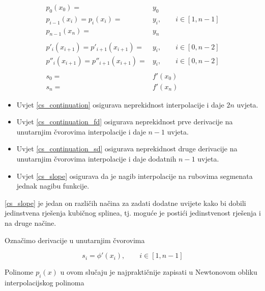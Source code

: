 \begin{conditionbox}
    \begin{align}
        p_0(x_0) =& y_0\nonumber\\
        \label{cs_continuation}
        p_{i-1}(x_i) = p_i(x_i) =& y_i,\qquad i\in[1,n-1]\\
        p_{n-1}(x_n) =& y_n\nonumber\\\nonumber\\
        \label{cs_continuation_fd}
        p'_{i}(x_{i+1}) = p'_{i+1}(x_{i+1}) =& y_i,\qquad i\in[0,n-2]\\
        \label{cs_continuation_sd}
        p''_{i}(x_{i+1}) = p''_{i+1}(x_{i+1}) =& y_i,\qquad i\in[0,n-2]\\\nonumber\\
        s_0=&f'(x_0)\nonumber\\
        \label{cs_slope}
        s_n=&f'(x_n)
    \end{align}

    \begin{itemize}
        \item Uvjet \ref{cs_continuation} osigurava neprekidnost interpolacije i daje $2n$ uvjeta.
        \item Uvjet \ref{cs_continuation_fd} osigurava neprekidnost prve derivacije na unutarnjim čvorovima interpolacije i daje $n-1$ uvjeta.
        \item Uvjet \ref{cs_continuation_sd} osigurava neprekidnost druge derivacije na unutarnjim čvorovima interpolacije i daje dodatnih $n-1$ uvjeta.
        \item Uvjet \ref{cs_slope} osigurava da je nagib interpolacije na rubovima segmenata jednak nagibu funkcije.
    \end{itemize}

    \ref{cs_slope} je jedan on različih načina za zadati dodatne uvijete kako bi dobili jedinstvena rješenja kubičnog splinea, tj. moguće je postići jedinstvenost rješenja i na druge načine.
\end{conditionbox}

\newpage

Označimo derivacije u unutarnjim čvorovima

\begin{equation*}
s_i=\phi'(x_i),\qquad i\in[1,n-1]
\end{equation*}

Polinome $p_i(x)$ u ovom slučaju je najpraktičnije zapisati u Newtonovom obliku interpolacijskog polinoma

